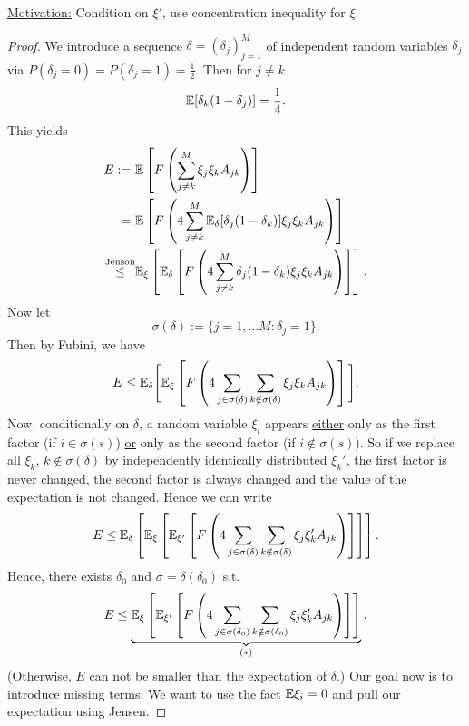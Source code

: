 \underline{Motivation:} Condition on $\xi'$, use concentration inequality for $\xi$.
\begin{proof}
We introduce a sequence $\delta = (\delta_j)_{j=1}^M$ of independent random variables $\delta_j$ via $P(\delta_j =0) =P(\delta_j=1)=\frac{1}{2}$. Then for $j \neq k$
$$
\mathbb{E} [\delta_k(1-\delta_j)] = \frac{1}{4}.
$$
This yields
\begin{equation*}
\begin{split}
E:= \ &
\E \left[ F\left(
\sum_{j\neq k}^M \xi_j \xi_k A_{jk}
\right)  \right] \\
= \ &
\E \left[ F\left( 4 
\sum_{j\neq k}^M \E_\delta [\delta_j(1-\delta_k)] \xi_j \xi_k A_{jk}
\right)  \right] \\
\overset{\text{Jenson}}{\leq} & 
\E_\xi \left[\E_\delta\left[
F\left(4
\sum_{j\neq k}^M
\delta_j(1-\delta_k)\xi_j\xi_kA_{jk}
\right) %
\right] 
\right].
\end{split}
\end{equation*}
Now let
$$\sigma(\delta) := \{ j=1,...M: \delta_j =1 \}.$$
Then by Fubini, we have
$$E\leq \E_{\delta}\Bigg[ \E_\xi\left[
F\left( 4
\sum_{j\in \sigma(\delta)} \sum_{k\notin \sigma(\delta)}
\xi_j\xi_kA_{jk}
\right) %
\right] 
\Bigg].
$$
Now, conditionally on $\delta$, a random variable $\xi_i$ appears \underline{either} only as the first factor (if $i \in \sigma(s)$) \underline{or} only as the second factor (if $i \notin \sigma(s)$). So if we replace all $\xi_k$, $k\notin \sigma(\delta)$ by independently identically distributed $\xi_k'$, the first factor is never changed, the second factor is always changed and the value of the expectation is not changed. Hence we can write
\begin{equation*}
E\leq \mathbb{E}_\delta \left[ \mathbb{E}_\xi \left[\mathbb{E}_{\xi'}
\left[
F\left(
4 \sum_{j\in\sigma(\delta)} \sum_{k \notin \sigma(\delta)} \xi_j \xi_k' A_{jk}
\right)
\right]
\right] \right].
\end{equation*}
Hence, there exists $\delta_0$ and $\sigma =\delta(\delta_0)$ s.t. 
\begin{equation*}
E\leq  \underbrace{ \mathbb{E}_\xi \left[\mathbb{E}_{\xi'}
\left[
F\left(
4 \sum_{j\in\sigma(\delta_0)} \sum_{k \notin \sigma(\delta_0)} \xi_j \xi_k' A_{jk}
\right)
\right]
\right]}_{(*)}.
\end{equation*}
(Otherwise, $E$ can not be smaller than the expectation of $\delta$.) Our \underline{goal} now is to introduce missing terms. We want to use the fact $\mathbb{E} \xi_i =0$ and pull our expectation using Jensen.

\end{proof}

